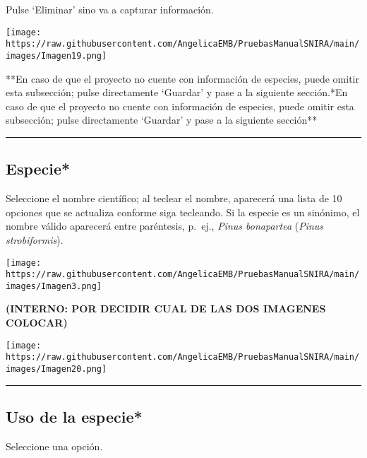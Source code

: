\documentclass[
]{book}
\begin{document}
Pulse `Eliminar' sino va a capturar información.

\texttt{[image: https://raw.githubusercontent.com/AngelicaEMB/PruebasManualSNIRA/main/images/Imagen19.png]}

**En caso de que el proyecto no cuente con información de especies, puede omitir esta subsección; pulse directamente `Guardar' y pase a la siguiente sección.*En caso de que el proyecto no cuente con información de especies, puede omitir esta subsección; pulse directamente `Guardar' y pase a la siguiente sección**

\begin{center}\rule{0.5\linewidth}{0.5pt}\end{center}

\hypertarget{especie}{%
\subsection*{\texorpdfstring{{Especie*}}{Especie*}}\label{especie}}

Seleccione el nombre científico; al teclear el nombre, aparecerá una lista de 10 opciones que se actualiza conforme siga tecleando. Si la especie es un sinónimo, el nombre válido aparecerá entre paréntesis, p.~ej., \emph{Pinus bonapartea} (\emph{Pinus strobiformis}).

\texttt{[image: https://raw.githubusercontent.com/AngelicaEMB/PruebasManualSNIRA/main/images/Imagen3.png]}

\textbf{(INTERNO: POR DECIDIR CUAL DE LAS DOS IMAGENES COLOCAR)}

\texttt{[image: https://raw.githubusercontent.com/AngelicaEMB/PruebasManualSNIRA/main/images/Imagen20.png]}

\begin{center}\rule{0.5\linewidth}{0.5pt}\end{center}

\hypertarget{uso-de-la-especie}{%
\subsection*{\texorpdfstring{{Uso de la especie*}}{Uso de la especie*}}\label{uso-de-la-especie}}

Seleccione una opción.
\end{document}
